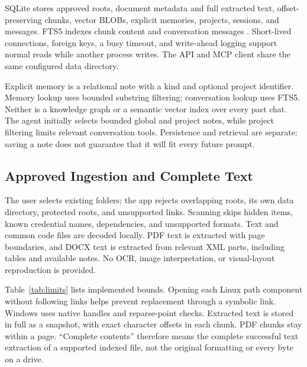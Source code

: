\documentclass[conference,letterpaper]{IEEEtran}
\begin{document}
SQLite stores approved roots, document metadata and full extracted text, offset-preserving chunks, vector BLOBs, explicit memories, projects, sessions, and messages. FTS5 indexes chunk content and conversation messages \cite{sqlite}. Short-lived connections, foreign keys, a busy timeout, and write-ahead logging support normal reads while another process writes. The API and MCP client share the same configured data directory.

Explicit memory is a relational note with a kind and optional project identifier. Memory lookup uses bounded substring filtering; conversation lookup uses FTS5. Neither is a knowledge graph or a semantic vector index over every past chat. The agent initially selects bounded global and project notes, while project filtering limits relevant conversation tools. Persistence and retrieval are separate: saving a note does not guarantee that it will fit every future prompt.

\subsection{Approved Ingestion and Complete Text}
The user selects existing folders; the app rejects overlapping roots, its own data directory, protected roots, and unsupported links. Scanning skips hidden items, known credential names, dependencies, and unsupported formats. Text and common code files are decoded locally. PDF text is extracted with page boundaries, and DOCX text is extracted from relevant XML parts, including tables and available notes. No OCR, image interpretation, or visual-layout reproduction is provided.

Table~\ref{tab:limits} lists implemented bounds. Opening each Linux path component without following links helps prevent replacement through a symbolic link. Windows uses native handles and reparse-point checks. Extracted text is stored in full as a snapshot, with exact character offsets in each chunk. PDF chunks stay within a page. ``Complete contents'' therefore means the complete successful text extraction of a supported indexed file, not the original formatting or every byte on a drive.
\end{document}
